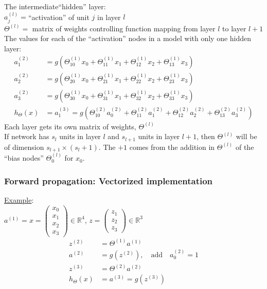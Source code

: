 The intermediate``hidden'' layer:\\
$a_j^{(l)} = $``activation'' of unit $j$ in layer $l$\\
$\Theta^{(l)} = $ matrix of weights controlling function mapping from layer $l$ to layer $l+1$\\

The values for each of the ``activation'' nodes in a model with only one hidden layer:
\begin{align*}
a_1^{(2)}&=g(\Theta_{10}^{(1)}x_0+\Theta_{11}^{(1)}x_1+\Theta_{12}^{(1)}x_2+\Theta_{13}^{(1)}x_3)\\
a_2^{(2)}&=g(\Theta_{20}^{(1)}x_0+\Theta_{21}^{(1)}x_1+\Theta_{22}^{(1)}x_2+\Theta_{23}^{(1)}x_3)\\
a_3^{(2)}&=g(\Theta_{30}^{(1)}x_0+\Theta_{31}^{(1)}x_1+\Theta_{32}^{(1)}x_2+\Theta_{33}^{(1)}x_3)\\
h_{\Theta}(x)&=a_1^{(3)}=g(\Theta_{10}^{(2)}a_0^{(2)}+\Theta_{11}^{(2)}a_1^{(2)}+\Theta_{12}^{(2)}a_2^{(2)}+\Theta_{13}^{(2)}a_3^{(2)})
\end{align*}
Each layer gets its own matrix of weights, $\Theta^{(l)}$\\
If network has $s_l$ units in layer $l$ and $s_{l+1}$ units in layer $l+1$, then $\Theta^{(l)}$ will be of dimension $s_{l+1} \times (s_{l}+1)$. The $+1$ comes from the addition in $\Theta^{(l)}$ of the ``bias nodes'' $\Theta^{(l)}_0$ for $x_0$.

\subsubsection{Forward propagation: Vectorized implementation}

\underline{Example}:\\
$a^{(1)} = x = \begin{pmatrix} x_0 \\ x_1 \\ x_2 \\ x_3 \end{pmatrix} \in \mathbb{R}^{4}$, \quad
$z = \begin{pmatrix} z_1 \\ z_2 \\ z_3 \end{pmatrix} \in \mathbb{R}^{3}$\\
\begin{align*}
z^{(2)} &= \Theta^{(1)}a^{(1)}\\
a^{(2)} &= g(z^{(2)}), \quad \text{add} \quad a^{(2)}_0 = 1\\
z^{(3)} &= \Theta^{(2)}a^{(2)}\\
h_{\Theta}(x) &= a^{(3)} = g(z^{(3)})
\end{align*}

